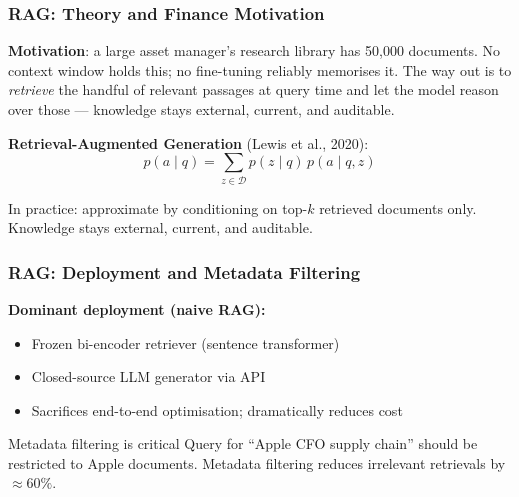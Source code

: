 \documentclass[9pt,t]{beamer}
\begin{document}
\begin{frame}
\frametitle{RAG: Theory and Finance Motivation}

\begin{bigpicture}
\textbf{Motivation}: a large asset manager's research library has 50,000 documents.
No context window holds this; no fine-tuning reliably memorises it. The way out is
to \emph{retrieve} the handful of relevant passages at query time and let the model
reason over those --- knowledge stays external, current, and auditable.
\end{bigpicture}

\medskip
\textbf{Retrieval-Augmented Generation} (Lewis et al., 2020):
\[
  p(a \mid q) = \sum_{z \in \mathcal{D}} p(z \mid q)\, p(a \mid q, z)
\]

In practice: approximate by conditioning on top-$k$ retrieved documents only.
Knowledge stays external, current, and auditable.
\end{frame}

\begin{frame}
\frametitle{RAG: Deployment and Metadata Filtering}

\textbf{Dominant deployment (naive RAG):}
\begin{itemize}
  \item Frozen bi-encoder retriever (sentence transformer)
  \item Closed-source LLM generator via API
  \item Sacrifices end-to-end optimisation; dramatically reduces cost
\end{itemize}

\medskip
\begin{alertblock}{Metadata filtering is critical}
Query for ``Apple CFO supply chain'' should be restricted to Apple documents.
Metadata filtering reduces irrelevant retrievals by $\approx 60\%$.
\end{alertblock}
\end{frame}
\end{document}
